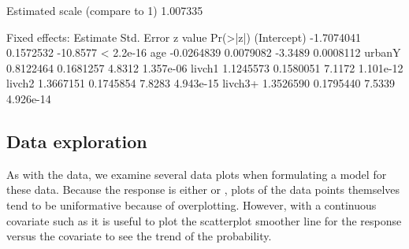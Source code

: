 \documentclass[12pt]{article}
\begin{document}
\begin{Schunk}
\begin{Soutput}
Estimated scale (compare to 1)  1.007335 

Fixed effects:
              Estimate Std. Error  z value  Pr(>|z|)
(Intercept) -1.7074041  0.1572532 -10.8577 < 2.2e-16
age         -0.0264839  0.0079082  -3.3489 0.0008112
urbanY       0.8122464  0.1681257   4.8312 1.357e-06
livch1       1.1245573  0.1580051   7.1172 1.101e-12
livch2       1.3667151  0.1745854   7.8283 4.943e-15
livch3+      1.3526590  0.1795440   7.5339 4.926e-14
\end{Soutput}
\end{Schunk}


\subsection{Data exploration}
\label{sec:ContraExplor}

As with the  data, we examine several data plots when
formulating a model for these data.  Because the response is either
 or , plots of the data points themselves tend to
be uniformative because of overplotting.  However, with a continuous
covariate such as  it is useful to plot the scatterplot
smoother line for the response versus the covariate to see the trend
of the probability.  
\end{document}
